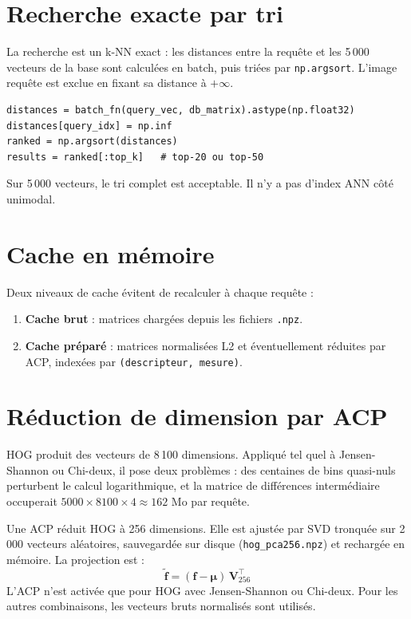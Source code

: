 \documentclass[12pt,a4paper]{report}
\begin{document}
\section{Recherche exacte par tri}

La recherche est un k-NN exact : les distances entre la requête et les 5\,000 vecteurs de la base sont calculées en batch, puis triées par \texttt{np.argsort}. L'image requête est exclue en fixant sa distance à $+\infty$.

\begin{lstlisting}[style=python, caption={Noyau de recherche (app/searcher.py)}]
distances = batch_fn(query_vec, db_matrix).astype(np.float32)
distances[query_idx] = np.inf
ranked = np.argsort(distances)
results = ranked[:top_k]   # top-20 ou top-50
\end{lstlisting}

Sur 5\,000 vecteurs, le tri complet est acceptable. Il n'y a pas d'index ANN côté unimodal.

\section{Cache en mémoire}

Deux niveaux de cache évitent de recalculer à chaque requête :
\begin{enumerate}
  \item \textbf{Cache brut} : matrices chargées depuis les fichiers \texttt{.npz}.
  \item \textbf{Cache préparé} : matrices normalisées L2 et éventuellement réduites par ACP, indexées par \texttt{(descripteur, mesure)}.
\end{enumerate}

\section{Réduction de dimension par ACP}
\label{sec:pca}

HOG produit des vecteurs de 8\,100 dimensions. Appliqué tel quel à Jensen-Shannon ou Chi-deux, il pose deux problèmes : des centaines de bins quasi-nuls perturbent le calcul logarithmique, et la matrice de différences intermédiaire occuperait $5000 \times 8100 \times 4 \approx 162$ Mo par requête.

Une ACP réduit HOG à 256 dimensions. Elle est ajustée par SVD tronquée sur 2\,000 vecteurs aléatoires, sauvegardée sur disque (\texttt{hog\_pca256.npz}) et rechargée en mémoire. La projection est :
\[
  \tilde{\mathbf{f}} = (\mathbf{f} - \boldsymbol{\mu})\,\mathbf{V}_{256}^\top
\]
L'ACP n'est activée que pour HOG avec Jensen-Shannon ou Chi-deux. Pour les autres combinaisons, les vecteurs bruts normalisés sont utilisés.
\end{document}
